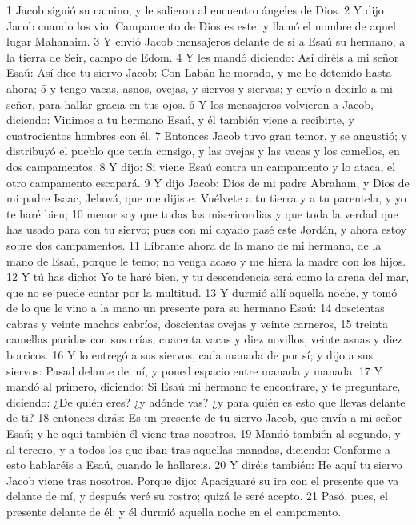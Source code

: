 1 Jacob siguió su camino, y le salieron al encuentro ángeles de Dios.
2 Y dijo Jacob cuando los vio: Campamento de Dios es este; y llamó el nombre de aquel lugar Mahanaim.
3 Y envió Jacob mensajeros delante de sí a Esaú su hermano, a la tierra de Seir, campo de Edom.
4 Y les mandó diciendo: Así diréis a mi señor Esaú: Así dice tu siervo Jacob: Con Labán he morado, y me he detenido hasta ahora;
5 y tengo vacas, asnos, ovejas, y siervos y siervas; y envío a decirlo a mi señor, para hallar gracia en tus ojos.
6 Y los mensajeros volvieron a Jacob, diciendo: Vinimos a tu hermano Esaú, y él también viene a recibirte, y cuatrocientos hombres con él.
7 Entonces Jacob tuvo gran temor, y se angustió; y distribuyó el pueblo que tenía consigo, y las ovejas y las vacas y los camellos, en dos campamentos.
8 Y dijo: Si viene Esaú contra un campamento y lo ataca, el otro campamento escapará.
9 Y dijo Jacob: Dios de mi padre Abraham, y Dios de mi padre Isaac, Jehová, que me dijiste: Vuélvete a tu tierra y a tu parentela, y yo te haré bien;
10 menor soy que todas las misericordias y que toda la verdad que has usado para con tu siervo; pues con mi cayado pasé este Jordán, y ahora estoy sobre dos campamentos.
11 Líbrame ahora de la mano de mi hermano, de la mano de Esaú, porque le temo; no venga acaso y me hiera la madre con los hijos.
12 Y tú has dicho: Yo te haré bien, y tu descendencia será como la arena del mar, que no se puede contar por la multitud.
13 Y durmió allí aquella noche, y tomó de lo que le vino a la mano un presente para su hermano Esaú:
14 doscientas cabras y veinte machos cabríos, doscientas ovejas y veinte carneros,
15 treinta camellas paridas con sus crías, cuarenta vacas y diez novillos, veinte asnas y diez borricos.
16 Y lo entregó a sus siervos, cada manada de por sí; y dijo a sus siervos: Pasad delante de mí, y poned espacio entre manada y manada.
17 Y mandó al primero, diciendo: Si Esaú mi hermano te encontrare, y te preguntare, diciendo: ¿De quién eres? ¿y adónde vas? ¿y para quién es esto que llevas delante de ti?
18 entonces dirás: Es un presente de tu siervo Jacob, que envía a mi señor Esaú; y he aquí también él viene tras nosotros.
19 Mandó también al segundo, y al tercero, y a todos los que iban tras aquellas manadas, diciendo: Conforme a esto hablaréis a Esaú, cuando le hallareis.
20 Y diréis también: He aquí tu siervo Jacob viene tras nosotros. Porque dijo: Apaciguaré su ira con el presente que va delante de mí, y después veré su rostro; quizá le seré acepto.
21 Pasó, pues, el presente delante de él; y él durmió aquella noche en el campamento.

